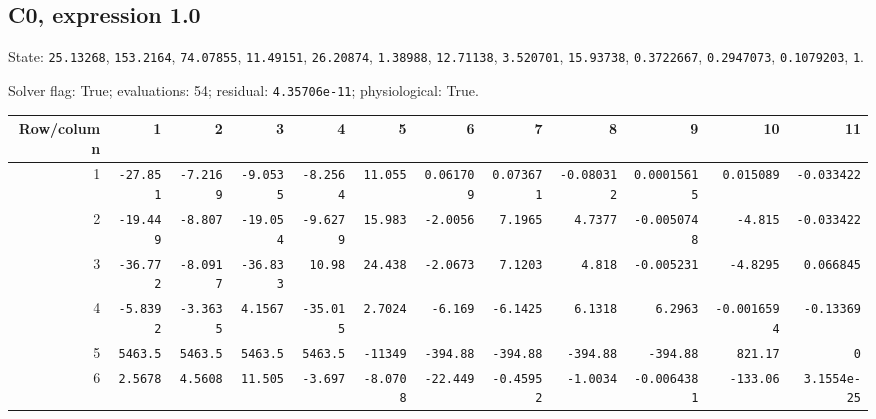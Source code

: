 \begin{landscape}
\subsection*{C0, expression 1.0}
{\scriptsize State: \texttt{25.13268}, \texttt{153.2164}, \texttt{74.07855}, \texttt{11.49151}, \texttt{26.20874}, \texttt{1.38988}, \texttt{12.71138}, \texttt{3.520701}, \texttt{15.93738}, \texttt{0.3722667}, \texttt{0.2947073}, \texttt{0.1079203}, \texttt{1}.\par

Solver flag: True; evaluations: 54; residual: \texttt{4.35706e-11}; physiological: True.\par}

\begingroup\scriptsize\setlength{\tabcolsep}{3pt}\centering
\begin{tabular}{rrrrrrrrrrrr}\toprule

Row/column & 1 & 2 & 3 & 4 & 5 & 6 & 7 & 8 & 9 & 10 & 11 \\ \midrule

1 & \texttt{-27.851} & \texttt{-7.2169} & \texttt{-9.0535} & \texttt{-8.2564} & \texttt{11.055} & \texttt{0.061709} & \texttt{0.073671} & \texttt{-0.080312} & \texttt{0.00015615} & \texttt{0.015089} & \texttt{-0.033422} \\

2 & \texttt{-19.449} & \texttt{-8.807} & \texttt{-19.054} & \texttt{-9.6279} & \texttt{15.983} & \texttt{-2.0056} & \texttt{7.1965} & \texttt{4.7377} & \texttt{-0.0050748} & \texttt{-4.815} & \texttt{-0.033422} \\

3 & \texttt{-36.772} & \texttt{-8.0917} & \texttt{-36.833} & \texttt{10.98} & \texttt{24.438} & \texttt{-2.0673} & \texttt{7.1203} & \texttt{4.818} & \texttt{-0.005231} & \texttt{-4.8295} & \texttt{0.066845} \\

4 & \texttt{-5.8392} & \texttt{-3.3635} & \texttt{4.1567} & \texttt{-35.015} & \texttt{2.7024} & \texttt{-6.169} & \texttt{-6.1425} & \texttt{6.1318} & \texttt{6.2963} & \texttt{-0.0016594} & \texttt{-0.13369} \\

5 & \texttt{5463.5} & \texttt{5463.5} & \texttt{5463.5} & \texttt{5463.5} & \texttt{-11349} & \texttt{-394.88} & \texttt{-394.88} & \texttt{-394.88} & \texttt{-394.88} & \texttt{821.17} & \texttt{0} \\

6 & \texttt{2.5678} & \texttt{4.5608} & \texttt{11.505} & \texttt{-3.697} & \texttt{-8.0708} & \texttt{-22.449} & \texttt{-0.45952} & \texttt{-1.0034} & \texttt{-0.0064381} & \texttt{-133.06} & \texttt{3.1554e-25} \\


\end{tabular}
\end{landscape}
